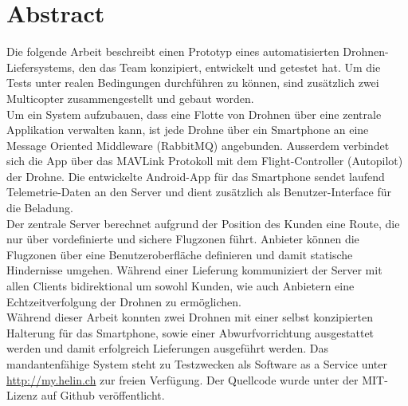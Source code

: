 \newpage
{}
\chapter*{Abstract}

Die folgende Arbeit beschreibt einen Prototyp eines automatisierten Drohnen-Liefersystems, den das Team konzipiert, entwickelt und getestet hat. Um die Tests unter realen Bedingungen durchführen zu können, sind zusätzlich zwei Multicopter zusammengestellt und gebaut worden.\\

Um ein System aufzubauen, dass eine Flotte von Drohnen über eine zentrale Applikation verwalten kann, ist jede Drohne über ein Smartphone an eine Message Oriented Middleware (RabbitMQ) angebunden. Ausserdem verbindet sich die App über das \Gls{MAVLink} Protokoll mit dem \Gls{Flight-Controller} (Autopilot) der Drohne. 
Die entwickelte Android-App für das Smartphone sendet laufend Telemetrie-Daten an den Server und dient zusätzlich als Benutzer-Interface für die Beladung. \\

Der zentrale Server berechnet aufgrund der Position des Kunden eine Route, die nur über vordefinierte und sichere Flugzonen führt. Anbieter können die Flugzonen über eine Benutzeroberfläche definieren und damit statische Hindernisse umgehen. Während einer Lieferung kommuniziert der Server mit allen Clients bidirektional um sowohl Kunden, wie auch Anbietern eine Echtzeitverfolgung der Drohnen zu ermöglichen. \\

Während dieser Arbeit konnten zwei Drohnen mit einer selbst konzipierten Halterung für das Smartphone, sowie einer Abwurfvorrichtung ausgestattet werden und damit erfolgreich Lieferungen ausgeführt werden. Das mandantenfähige System steht zu Testzwecken als Software as a Service unter \url{http://my.helin.ch} zur freien Verfügung. Der Quellcode wurde unter der MIT-Lizenz auf Github veröffentlicht.
